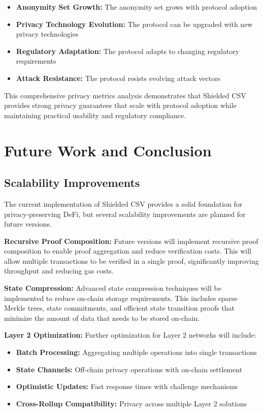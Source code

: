 \documentclass[11pt,a4paper]{article}
\begin{document}
\begin{itemize}
    \item \textbf{Anonymity Set Growth:} The anonymity set grows with protocol adoption
    \item \textbf{Privacy Technology Evolution:} The protocol can be upgraded with new privacy technologies
    \item \textbf{Regulatory Adaptation:} The protocol adapts to changing regulatory requirements
    \item \textbf{Attack Resistance:} The protocol resists evolving attack vectors
\end{itemize}

This comprehensive privacy metrics analysis demonstrates that Shielded CSV provides strong privacy guarantees that scale with protocol adoption while maintaining practical usability and regulatory compliance.

\section{Future Work and Conclusion}

\subsection{Scalability Improvements}

The current implementation of Shielded CSV provides a solid foundation for privacy-preserving DeFi, but several scalability improvements are planned for future versions.

\textbf{Recursive Proof Composition:}
Future versions will implement recursive proof composition to enable proof aggregation and reduce verification costs. This will allow multiple transactions to be verified in a single proof, significantly improving throughput and reducing gas costs.

\textbf{State Compression:}
Advanced state compression techniques will be implemented to reduce on-chain storage requirements. This includes sparse Merkle trees, state commitments, and efficient state transition proofs that minimize the amount of data that needs to be stored on-chain.

\textbf{Layer 2 Optimization:}
Further optimization for Layer 2 networks will include:
\begin{itemize}
    \item \textbf{Batch Processing:} Aggregating multiple operations into single transactions
    \item \textbf{State Channels:} Off-chain privacy operations with on-chain settlement
    \item \textbf{Optimistic Updates:} Fast response times with challenge mechanisms
    \item \textbf{Cross-Rollup Compatibility:} Privacy across multiple Layer 2 solutions
\end{itemize}
\end{document}
